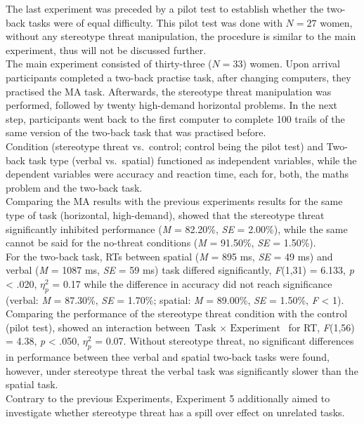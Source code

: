 \documentclass[
  stu,floatsintext]{apa7}
\begin{document}
The last experiment was preceded by a pilot test to establish whether the two-back tasks were of equal difficulty.
This pilot test was done with \(N = 27\) women, without any stereotype threat manipulation, the procedure is similar to the main experiment, thus will not be discussed further.\\
The main experiment consisted of thirty-three (\(N = 33\)) women.
Upon arrival participants completed a two-back practise task, after changing computers, they practised the MA task.
Afterwards, the stereotype threat manipulation was performed, followed by twenty high-demand horizontal problems.
In the next step, participants went back to the first computer to complete 100 trails of the same version of the two-back task that was practised before.\\
Condition (stereotype threat vs.~control; control being the pilot test) and Two-back task type (verbal vs.~spatial) functioned as independent variables, while the dependent variables were accuracy and reaction time, each for, both, the maths problem and the two-back task.\\
Comparing the MA results with the previous experiments results for the same type of task (horizontal, high-demand), showed that the stereotype threat significantly inhibited performance (\emph{M} = 82.20\%, \emph{SE} = 2.00\%), while the same cannot be said for the no-threat conditions (\emph{M} = 91.50\%, \emph{SE} = 1.50\%).\\
For the two-back task, RTs between spatial (\emph{M} = 895 ms, \emph{SE} = 49 ms) and verbal (\emph{M} = 1087 ms, \emph{SE} = 59 ms) task differed significantly, \emph{F}(1,31) = 6.133, \emph{p} \textless{} .020, \(\eta^{2}_{p}\) = 0.17 while the difference in accuracy did not reach significance (verbal: \emph{M} = 87.30\%, \emph{SE} = 1.70\%; spatial: \emph{M} = 89.00\%, \emph{SE} = 1.50\%, \emph{F} \textless{} 1).
Comparing the performance of the stereotype threat condition with the control (pilot test), showed an interaction between \(\text{Task } \times \text{ Experiment }\) for RT, \emph{F}(1,56) = 4.38, \emph{p} \textless{} .050, \(\eta^{2}_{p}\) = 0.07.
Without stereotype threat, no significant differences in performance between thee verbal and spatial two-back tasks were found, however, under stereotype threat the verbal task was significantly slower than the spatial task.\\
Contrary to the previous Experiments, Experiment 5 additionally aimed to investigate whether stereotype threat has a spill over effect on unrelated tasks.
\end{document}
